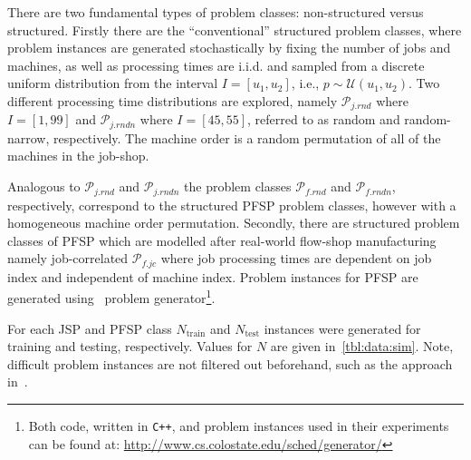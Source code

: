 \documentclass[a4paper,twoside]{article}
\begin{document}
There are two fundamental types of problem classes: non-structured versus structured. 
Firstly there are the ``conventional'' structured problem classes, where problem instances are generated stochastically by fixing the number of jobs and machines, as well as processing times are i.i.d. and sampled from a discrete uniform distribution from the interval $I=[u_1,u_2]$, i.e., $p\sim \mathcal{U}(u_1,u_2)$.
Two different processing time distributions are explored, namely 
$\mathcal{P}_{j.rnd}$ where $I=[1,99]$ and $\mathcal{P}_{j.rndn}$ where $I=[45,55]$, referred to as random and random-narrow, respectively.
The machine order is a random permutation of all of the machines in the job-shop. 

Analogous to $\mathcal{P}_{j.rnd}$ and $\mathcal{P}_{j.rndn}$ the problem classes $\mathcal{P}_{f.rnd}$ and $\mathcal{P}_{f.rndn}$, respectively, correspond to the structured PFSP problem classes, however with a homogeneous machine order permutation.  
Secondly, there are structured problem classes of PFSP which are modelled after real-world flow-shop manufacturing namely job-correlated $\mathcal{P}_{f.jc}$ where job processing times are dependent on job index and independent of machine index.
Problem instances for PFSP are generated using~\cite{Whitley} problem generator\footnote{Both code, written in \texttt{C++}, and problem instances used in their experiments can be found at: \url{http://www.cs.colostate.edu/sched/generator/}}. 

For each JSP and PFSP class $N_{\text{train}}$  and $N_{\text{test}}$ instances were generated for training and testing, respectively. Values for $N$ are given in~\cref{tbl:data:sim}. Note, difficult problem instances are not filtered out beforehand, such as the approach in~\cite{Whitley}. 
\end{document}
